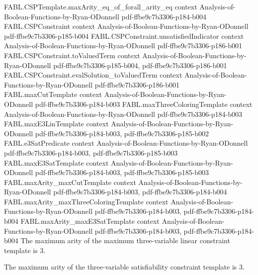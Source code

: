 \begin{theorem}
  {FABL.CSPTemplate.maxArity_eq_of_forall_arity_eq}
  {context}
  {Analysis-of-Boolean-Functions-by-Ryan-ODonnell}
  {pdf-ffbe9c7b3306-p184-b004}
\proofstep
  {FABL.CSPConstraint}
  {context}
  {Analysis-of-Boolean-Functions-by-Ryan-ODonnell}
  {pdf-ffbe9c7b3306-p185-b004}
\proofstep
  {FABL.CSPConstraint.unsatisfiedIndicator}
  {context}
  {Analysis-of-Boolean-Functions-by-Ryan-ODonnell}
  {pdf-ffbe9c7b3306-p186-b001}
\proofstep
  {FABL.CSPConstraint.toValuedTerm}
  {context}
  {Analysis-of-Boolean-Functions-by-Ryan-ODonnell}
  {pdf-ffbe9c7b3306-p185-b004,
    pdf-ffbe9c7b3306-p186-b001}
\proofstep
  {FABL.CSPConstraint.evalSolution_toValuedTerm}
  {context}
  {Analysis-of-Boolean-Functions-by-Ryan-ODonnell}
  {pdf-ffbe9c7b3306-p186-b001}
\proofstep
  {FABL.maxCutTemplate}
  {context}
  {Analysis-of-Boolean-Functions-by-Ryan-ODonnell}
  {pdf-ffbe9c7b3306-p184-b003}
\proofstep
  {FABL.maxThreeColoringTemplate}
  {context}
  {Analysis-of-Boolean-Functions-by-Ryan-ODonnell}
  {pdf-ffbe9c7b3306-p184-b003}
\proofstep
  {FABL.maxE3LinTemplate}
  {context}
  {Analysis-of-Boolean-Functions-by-Ryan-ODonnell}
  {pdf-ffbe9c7b3306-p184-b003,
    pdf-ffbe9c7b3306-p185-b002}
\proofstep
  {FABL.e3SatPredicate}
  {context}
  {Analysis-of-Boolean-Functions-by-Ryan-ODonnell}
  {pdf-ffbe9c7b3306-p184-b003,
    pdf-ffbe9c7b3306-p185-b003}
\proofstep
  {FABL.maxE3SatTemplate}
  {context}
  {Analysis-of-Boolean-Functions-by-Ryan-ODonnell}
  {pdf-ffbe9c7b3306-p184-b003,
    pdf-ffbe9c7b3306-p185-b003}
\proofstep
  {FABL.maxArity_maxCutTemplate}
  {context}
  {Analysis-of-Boolean-Functions-by-Ryan-ODonnell}
  {pdf-ffbe9c7b3306-p184-b003,
    pdf-ffbe9c7b3306-p184-b004}
\proofstep
  {FABL.maxArity_maxThreeColoringTemplate}
  {context}
  {Analysis-of-Boolean-Functions-by-Ryan-ODonnell}
  {pdf-ffbe9c7b3306-p184-b003,
    pdf-ffbe9c7b3306-p184-b004}
\proofstep
  {FABL.maxArity_maxE3SatTemplate}
  {context}
  {Analysis-of-Boolean-Functions-by-Ryan-ODonnell}
  {pdf-ffbe9c7b3306-p184-b003,
    pdf-ffbe9c7b3306-p184-b004}
The maximum arity of the maximum three-variable linear constraint template is $3$.
\end{theorem}

\begin{theorem}
\label{FABL.maxArity_maxE3SatTemplate}
\leanok
{}
The maximum arity of the three-variable satisfiability constraint template is $3$.
\end{theorem}

